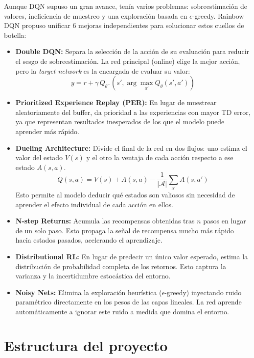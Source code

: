 \documentclass[onecolumn]{cwpreport} %
\begin{document}
Aunque DQN supuso un gran avance, tenía varios problemas: sobreestimación de valores, ineficiencia de muestreo y una exploración basada en $\epsilon$-greedy. Rainbow DQN \citep{Rainbow} propuso unificar 6 mejoras independientes para solucionar estos cuellos de botella:

\begin{itemize}
    \item \textbf{Double DQN:} Separa la selección de la acción de su evaluación para reducir el sesgo de sobreestimación. La red principal (online) elige la mejor acción, pero la \textit{target network} es la encargada de evaluar su valor:
          \[
              y = r + \gamma \, Q_{\theta^-}(s', \arg\max_{a'} Q_\theta(s', a'))
          \]
    \item \textbf{Prioritized Experience Replay (PER):} En lugar de muestrear aleatoriamente del buffer, da prioridad a las experiencias con mayor TD error, ya que representan resultados inesperados de los que el modelo puede aprender más rápido.
    \item \textbf{Dueling Architecture:} Divide el final de la red en dos flujos: uno estima el valor del estado $V(s)$ y el otro la ventaja de cada acción respecto a ese estado $A(s, a)$.
          \[
              Q(s, a) = V(s) + A(s, a) - \frac{1}{|\mathcal{A}|} \sum_{a'} A(s, a')
          \]
          Esto permite al modelo deducir qué estados son valiosos sin necesidad de aprender el efecto individual de cada acción en ellos.
    \item \textbf{N-step Returns:} Acumula las recompensas obtenidas tras $n$ pasos en lugar de un solo paso. Esto propaga la señal de recompensa mucho más rápido hacia estados pasados, acelerando el aprendizaje.
    \item \textbf{Distributional RL:} En lugar de predecir un único valor esperado, estima la distribución de probabilidad completa de los retornos. Esto captura la varianza y la incertidumbre estocástica del entorno.
    \item \textbf{Noisy Nets:} Elimina la exploración heurística ($\epsilon$-greedy) inyectando ruido paramétrico directamente en los pesos de las capas lineales. La red aprende automáticamente a ignorar este ruido a medida que domina el entorno.
\end{itemize}

\section{Estructura del proyecto}
\end{document}
